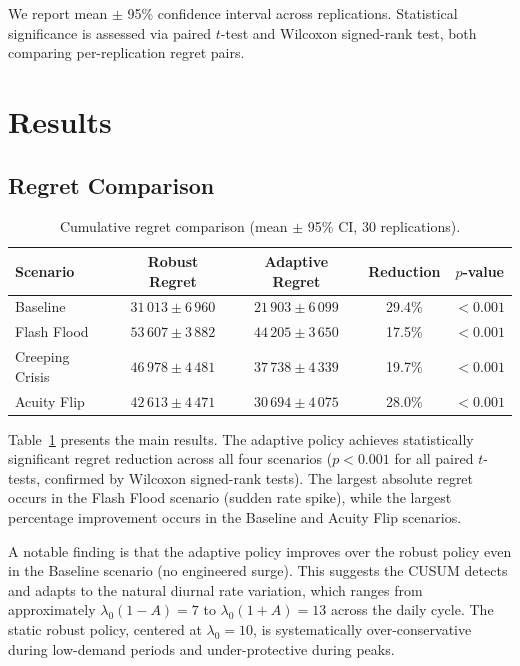 \documentclass[11pt,twocolumn]{article}
\theoremstyle{plain}
\theoremstyle{definition}
\begin{document}
We report mean $\pm$ 95\% confidence interval across replications. Statistical significance is assessed via paired $t$-test and Wilcoxon signed-rank test, both comparing per-replication regret pairs.

\section{Results}

\subsection{Regret Comparison}

\begin{table}[!htbp]
\centering
\caption{Cumulative regret comparison (mean $\pm$ 95\% CI, 30 replications).}
\label{tab:results}
\small
\begin{tabular}{lcccc}
\toprule
Scenario & Robust Regret & Adaptive Regret & Reduction & $p$-value \\
\midrule
Baseline      & $31\,013 \pm 6\,960$ & $21\,903 \pm 6\,099$ & 29.4\% & $<0.001$ \\
Flash Flood   & $53\,607 \pm 3\,882$ & $44\,205 \pm 3\,650$ & 17.5\% & $<0.001$ \\
Creeping Crisis & $46\,978 \pm 4\,481$ & $37\,738 \pm 4\,339$ & 19.7\% & $<0.001$ \\
Acuity Flip   & $42\,613 \pm 4\,471$ & $30\,694 \pm 4\,075$ & 28.0\% & $<0.001$ \\
\bottomrule
\end{tabular}
\end{table}

Table~\ref{tab:results} presents the main results. The adaptive policy achieves statistically significant regret reduction across all four scenarios ($p < 0.001$ for all paired $t$-tests, confirmed by Wilcoxon signed-rank tests). The largest absolute regret occurs in the Flash Flood scenario (sudden rate spike), while the largest percentage improvement occurs in the Baseline and Acuity Flip scenarios.

A notable finding is that the adaptive policy improves over the robust policy even in the Baseline scenario (no engineered surge). This suggests the CUSUM detects and adapts to the natural diurnal rate variation, which ranges from approximately $\lambda_0(1 - A) = 7$ to $\lambda_0(1 + A) = 13$ across the daily cycle. The static robust policy, centered at $\lambda_0 = 10$, is systematically over-conservative during low-demand periods and under-protective during peaks.
\end{document}
